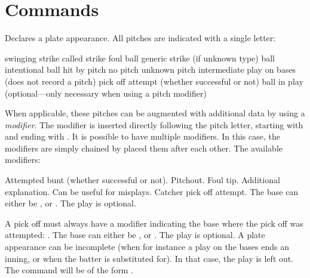 \documentclass{techdoc}
\begin{document}
    \chapter{Commands}
    \begin{description}
         Declares a plate appearance. All pitches are indicated with a single letter:
        \begin{description}
             swinging strike
             called strike
             foul ball
             generic strike (if unknown type)
             ball
             intentional ball
             hit by pitch
             no pitch
             unknown pitch
             intermediate play on bases (does not record a pitch)
             pick off attempt (whether successful or not)
             ball in play (optional---only necessary when using a pitch modifier)
        \end{description}
        When applicable, these pitches can be augmented with additional data by using a \emph{modifier}. The modifier is inserted directly following the pitch letter, starting with \code{/} and ending with \code{;}. It is possible to have multiple modifiers. In this case, the modifiers are simply chained by placed them after each other. The available modifiers:
        \begin{description}
             Attempted bunt (whether successful or not).
             Pitchout.
             Foul tip.
             Additional explanation. Can be useful for misplays.
             Catcher pick off attempt. The base can either be ,  or . The play is optional.
        \end{description}
        A pick off must always have a modifier indicating the base where the pick off was attempted: . The base can either be ,  or . The play is optional.
        A plate appearance can be incomplete (when for instance a play on the bases ends an inning, or when the batter is substituted for). In that case, the play is left out. The command will be of the form .

    \end{description}
\end{document}
